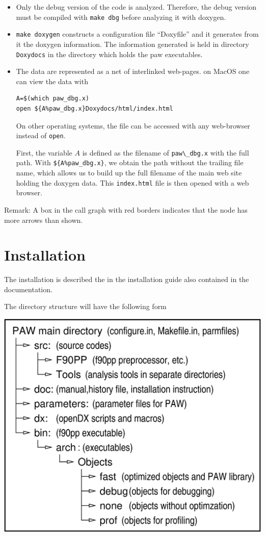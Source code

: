 \documentclass[final,12pt]{article}
\begin{document}
{{{{{{\begin{itemize}
\item Only the debug version of the code is analyzed. Therefore, the
  debug version must be compiled with \verb|make dbg| before analyzing
  it with doxygen. 
%
\item \verb|make doxygen| constructs a configuration file ``Doxyfile''
  and it generates from it the doxygen information.  The information
  generated is held in directory \verb|Doxydocs| in the directory
  which holds the paw executables.
%
\item The data are represented as a net of interlinked web-pages.
on MacOS one can view the data with
\begin{verbatim}
A=$(which paw_dbg.x)
open ${A%paw_dbg.x}Doxydocs/html/index.html
\end{verbatim}
On other operating systems, the file can be accessed with any
web-browser instead of \verb|open|.

First, the variable $A$ is defined as the filename of
\verb|paw\_dbg.x| with the full path. With \verb|${A%paw_dbg.x}|, we
obtain the path without the trailing file name, which allows us to
build up the full filename of the main web site holding the doxygen
data. This \verb|index.html| file is then opened with a web browser.
%
\end{itemize}


Remark: A box in the call graph with red borders indicates that the
node has more arrows than shown.


\appendix
\section{Installation}
The installation is described the in the installation guide also
contained in the documentation.

The directory structure will have the following form
\begin{center}
\includegraphics[width=0.8\linewidth]{Figs/PAWdirtree/pawdirtree.eps}
\end{center}



}}}}}}
\end{document}
